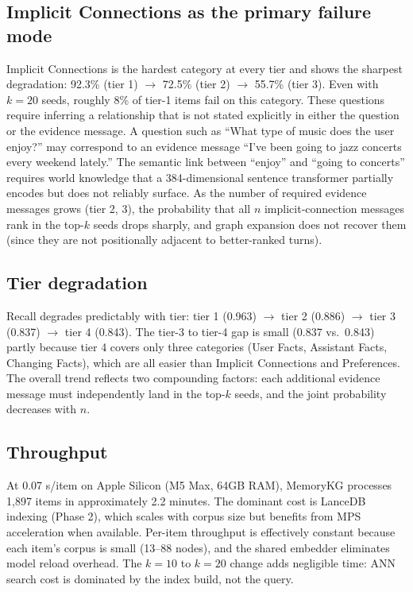 \documentclass[11pt,a4paper]{article}
\begin{document}
\subsection{Implicit Connections as the primary failure mode}

Implicit Connections is the hardest category at every tier and shows the sharpest
degradation: 92.3\% (tier 1) $\to$ 72.5\% (tier 2) $\to$ 55.7\% (tier 3).
Even with $k{=}20$ seeds, roughly 8\% of tier-1 items fail on this category.
These questions require inferring a relationship that is not stated explicitly in
either the question or the evidence message.
A question such as ``What type of music does the user enjoy?'' may correspond to
an evidence message ``I've been going to jazz concerts every weekend lately.''
The semantic link between ``enjoy'' and ``going to concerts'' requires world knowledge
that a 384-dimensional sentence transformer partially encodes but does not reliably
surface.
As the number of required evidence messages grows (tier 2, 3), the probability that
all $n$ implicit-connection messages rank in the top-$k$ seeds drops sharply,
and graph expansion does not recover them (since they are not positionally adjacent
to better-ranked turns).

\subsection{Tier degradation}

Recall degrades predictably with tier:
tier 1 (0.963) $\to$ tier 2 (0.886) $\to$ tier 3 (0.837) $\to$ tier 4 (0.843).
The tier-3 to tier-4 gap is small (0.837 vs.\ 0.843) partly because tier 4 covers only
three categories (User Facts, Assistant Facts, Changing Facts), which are all easier
than Implicit Connections and Preferences.
The overall trend reflects two compounding factors: each additional evidence message
must independently land in the top-$k$ seeds, and the joint probability decreases with $n$.

\subsection{Throughput}

At 0.07 s/item on Apple Silicon (M5 Max, 64GB RAM), MemoryKG processes 1,897 items in
approximately 2.2 minutes.
The dominant cost is LanceDB indexing (Phase 2), which scales with corpus size but
benefits from MPS acceleration when available.
Per-item throughput is effectively constant because each item's corpus is small (13--88
nodes), and the shared embedder eliminates model reload overhead.
The $k{=}10$ to $k{=}20$ change adds negligible time: ANN search cost is dominated by
the index build, not the query.
\end{document}
